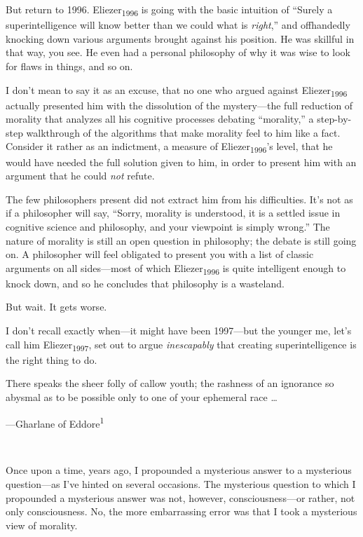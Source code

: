 {
 But return to 1996. Eliezer\textsubscript{1996} is going with the
basic intuition of ``Surely a superintelligence will
know better than we could what is \textit{right},''
and offhandedly knocking down various arguments brought against his
position. He was skillful in that way, you see. He even had a personal
philosophy of why it was wise to look for flaws in things, and so on.}

{
 I don't mean to say it as an excuse, that no one
who argued against Eliezer\textsubscript{1996} actually presented him
with the dissolution of the mystery---the full reduction of morality
that analyzes all his cognitive processes debating
``morality,'' a step-by-step
walkthrough of the algorithms that make morality feel to him like a
fact. Consider it rather as an indictment, a measure of
Eliezer\textsubscript{1996}'s level, that he would have
needed the full solution given to him, in order to present him with an
argument that he could \textit{not} refute.}

{
 The few philosophers present did not extract him from his
difficulties. It's not as if a philosopher will say,
``Sorry, morality is understood, it is a settled issue
in cognitive science and philosophy, and your viewpoint is simply
wrong.'' The nature of morality is still an open
question in philosophy; the debate is still going on. A philosopher
will feel obligated to present you with a list of classic arguments on
all sides---most of which Eliezer\textsubscript{1996} is quite
intelligent enough to knock down, and so he concludes that philosophy
is a wasteland.}

{
 But wait. It gets worse.}

{
 I don't recall exactly when---it might have been
1997---but the younger me, let's call him
Eliezer\textsubscript{1997}, set out to argue \textit{inescapably} that
creating superintelligence is the right thing to do.}

\myendsectiontext


{
 There speaks the sheer folly of callow youth; the rashness of an
ignorance so abysmal as to be possible only to one of your ephemeral
race \ldots}

{\raggedleft
 {}---Gharlane of Eddore\textsuperscript{1}
\par}


\bigskip

{
 ~}

{
 Once upon a time, years ago, I propounded a mysterious answer to a
mysterious question---as I've hinted on several
occasions. The mysterious question to which I propounded a mysterious
answer was not, however, consciousness---or rather, not only
consciousness. No, the more embarrassing error was that I took a
mysterious view of morality.}

